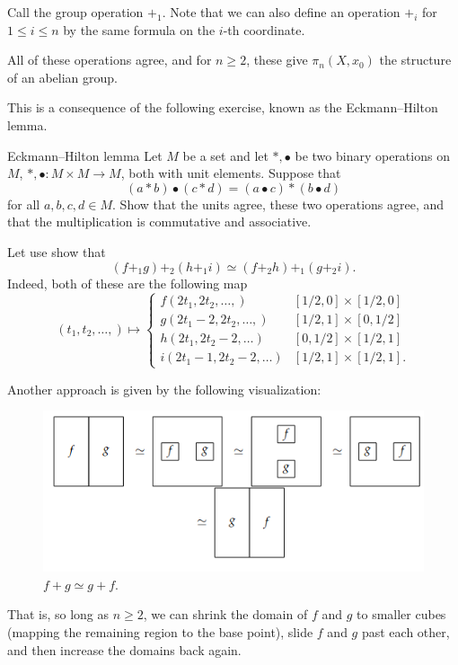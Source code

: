 \documentclass[ma3408.tex]{subfiles}
\begin{document}
\begin{Rem}
	Call the group operation $+_1$. Note that we can also define an operation $+_i$ for $1 \le i \le n$ by the same formula on the $i$-th coordinate. 
\end{Rem}
\begin{Thm}
	All of these operations agree, and for $n \ge 2$, these give $\pi_n(X,x_0)$ the structure of an abelian group. 
\end{Thm}
This is a consequence of the following exercise, known as the Eckmann--Hilton lemma. 
\begin{exercise}{Eckmann--Hilton lemma}{}
	Let $M$ be a set and let $\ast,\bullet$ be two binary operations on $M$, $\ast,\bullet \colon M \times M \to M$, both with unit elements. Suppose that 
	\[
(a \ast b) \bullet (c \ast d) = (a \bullet c) \ast (b \bullet d)
	\]
	for all $a,b,c,d \in M$. Show that the units agree, these two operations agree, and that the multiplication is commutative and associative. 
\end{exercise}
\begin{Rem}
	Let use show that 
	\[
(f+_1 g) +_2 (h+_1 i) \simeq (f+_2 h) +_1 (g+_2 i). 
	\]
	Indeed, both of these are the following map
	\[
(t_1,t_2,\ldots,) \mapsto \begin{cases}
	f(2t_1,2t_2,\ldots,) &[1/2,0] \times [1/2,0]\\
	g(2t_1-2,2t_2,\ldots,) & [1/2,1] \times [0,1/2]\\
h(2t_1,2t_2-2,\ldots) & [0,1/2] \times [1/2,1]\\
i(2t_1-1,2t_2-2,\ldots) & [1/2,1] \times [1/2,1].
\end{cases}
	\]
\end{Rem}
\begin{Rem}
	Another approach is given by the following visualization: 
\begin{figure}[h!] \centering\includegraphics[scale = 0.5]{abelian.png}\caption{$f + g \simeq g +f $.}\label{fig:abelian}\end{figure}
	That is, so long as $n \ge 2$, we can shrink the domain of $f$ and $g$ to smaller cubes (mapping the remaining region to the base point), slide $f$ and $g$ past each other, and then increase the domains back again. 
\end{Rem}
\end{document}
